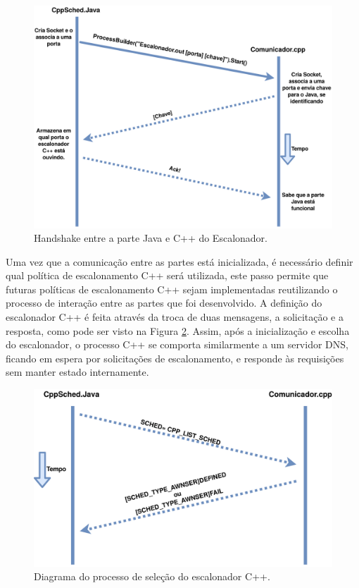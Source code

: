 \begin{figure}[htbp]
	\centerline{\includegraphics[width=13cm]{img/InicializacaoDoEscalonador.png}}
	\caption{Handshake entre a parte Java e C++ do Escalonador.}
	\label{Handshake_UML}
\end{figure}

Uma vez que a comunicação entre as partes está inicializada, é necessário definir qual política de escalonamento C++ será utilizada, este passo permite que futuras políticas de escalonamento C++ sejam implementadas reutilizando o processo de interação entre as partes que foi desenvolvido. A definição do escalonador C++ é feita através da troca de duas mensagens, a solicitação e a resposta, como pode ser visto na Figura \ref{SelecaoEscalonador_UML}. Assim, após a inicialização e escolha do escalonador, o processo C++ se comporta similarmente a um servidor \acrshort{DNS}\cite{dns_rfc}, ficando em espera por solicitações de escalonamento, e responde às requisições sem manter estado internamente.

\begin{figure}[htbp]
	\centerline{\includegraphics[width=13cm]{img/EscolhaDoEscalonadorCpp.png}}
	\caption{Diagrama do processo de seleção do escalonador C++.}
	\label{SelecaoEscalonador_UML}
\end{figure}


